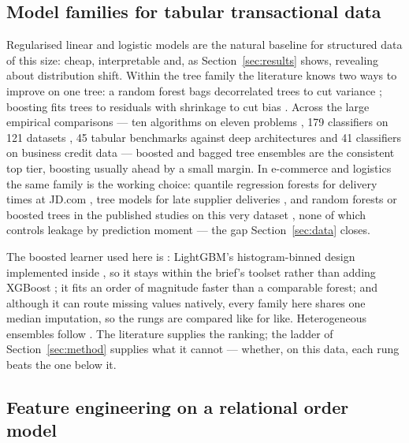 \subsection{Model families for tabular transactional data}

Regularised linear and logistic models are the natural baseline for structured
data of this size: cheap, interpretable and, as Section~\ref{sec:results}
shows, revealing about distribution shift. Within the tree family the
literature knows two ways to improve on one tree: a random forest bags
decorrelated trees to cut variance \citep{breiman2001rf}; boosting fits trees to
residuals with shrinkage to cut bias \citep{friedman2001gbm}. Across the large
empirical comparisons --- ten algorithms on eleven problems
\citep{caruana2006empirical}, 179 classifiers on 121 datasets
\citep{fernandezdelgado2014hundreds}, 45 tabular benchmarks against deep
architectures \citep{grinsztajn2022tabular, shwartzziv2022tabular} and 41
classifiers on business credit data \citep{lessmann2015benchmarking} ---
boosted and bagged tree ensembles are the consistent top tier, boosting usually
ahead by a small margin. In e-commerce and logistics the same family is the
working choice: quantile regression forests for delivery times at JD.com
\citep{salari2022delivery}, tree models for late supplier deliveries
\citep{baryannis2019risk}, and random forests or boosted trees in the published
studies on this very dataset \citep{fouad2023satisfaction,
wangkiat2023satisfaction, gopinadh2025satisfaction}, none of which controls
leakage by prediction moment --- the gap Section~\ref{sec:data} closes.

The boosted learner used here is : LightGBM's
histogram-binned design \citep{ke2017lightgbm} implemented inside
 \citep{sklearn2024hgb}, so it stays within the brief's
toolset rather than adding XGBoost \citep{chen2016xgboost}; it fits an order of
magnitude faster than a comparable forest; and although it can route missing
values natively, every family here shares one median imputation, so the rungs
are compared like for like. Heterogeneous ensembles
follow \citet{wolpert1992stacking}. The literature supplies the ranking; the
ladder of Section~\ref{sec:method} supplies what it cannot --- whether, on this
data, each rung beats the one below it.

\subsection{Feature engineering on a relational order model}

